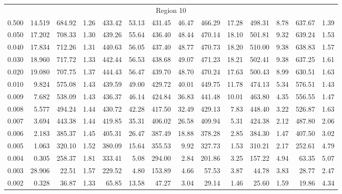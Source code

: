 \begin{tabular}{@{}lrrrrrrrrrrrrr@{}}
\midrule
\multicolumn{14}{c}{Region 10} \\
\cmidrule{1-14}
0.500 & 14.519 & 684.92 & 1.26 & 433.42 & 53.13 & 431.45 & 46.47 & 466.29 & 17.28 & 498.31 & 8.78 & 637.67 & 1.39 \\
0.050 & 17.202 & 708.33 & 1.30 & 439.26 & 55.64 & 436.40 & 48.44 & 470.14 & 18.10 & 501.81 & 9.32 & 639.24 & 1.53 \\
0.040 & 17.834 & 712.26 & 1.31 & 440.63 & 56.05 & 437.40 & 48.77 & 470.73 & 18.20 & 510.00 & 9.38 & 638.83 & 1.57 \\
0.030 & 18.960 & 717.72 & 1.33 & 442.44 & 56.53 & 438.68 & 49.07 & 471.23 & 18.21 & 502.41 & 9.38 & 637.25 & 1.61 \\
0.020 & 19.080 & 707.75 & 1.37 & 444.43 & 56.47 & 439.70 & 48.70 & 470.24 & 17.63 & 500.43 & 8.99 & 630.51 & 1.63 \\
0.010 & 9.824 & 575.08 & 1.43 & 439.59 & 49.00 & 429.72 & 40.01 & 449.75 & 11.78 & 474.13 & 5.34 & 576.51 & 1.43 \\
0.009 & 7.682 & 538.09 & 1.43 & 436.37 & 46.14 & 424.84 & 36.83 & 441.48 & 10.01 & 463.80 & 4.35 & 556.55 & 1.47 \\
0.008 & 5.577 & 494.24 & 1.44 & 430.72 & 42.28 & 417.50 & 32.49 & 429.13 & 7.83 & 448.40 & 3.22 & 526.87 & 1.63 \\
0.007 & 3.694 & 443.38 & 1.44 & 419.85 & 35.31 & 406.02 & 26.58 & 409.94 & 5.31 & 424.38 & 2.12 & 487.80 & 2.06 \\
0.006 & 2.183 & 385.37 & 1.45 & 405.31 & 26.47 & 387.49 & 18.88 & 378.28 & 2.85 & 384.30 & 1.47 & 407.50 & 3.02 \\
0.005 & 1.063 & 320.10 & 1.52 & 380.09 & 15.64 & 355.53 & 9.92 & 327.73 & 1.53 & 310.21 & 2.17 & 252.61 & 4.79 \\
0.004 & 0.305 & 258.37 & 1.81 & 333.41 & 5.08 & 294.00 & 2.84 & 201.86 & 3.25 & 157.22 & 4.94 & 63.35 & 5.07 \\
0.003 & 28.906 & 22.51 & 1.57 & 229.52 & 4.80 & 153.89 & 4.66 & 57.53 & 3.87 & 44.78 & 3.83 & 28.77 & 2.47 \\
0.002 & 0.328 & 36.87 & 1.33 & 65.85 & 13.58 & 47.27 & 3.04 & 29.14 & 1.46 & 25.60 & 1.59 & 19.86 & 4.34 \\

\bottomrule
\end{tabular}
